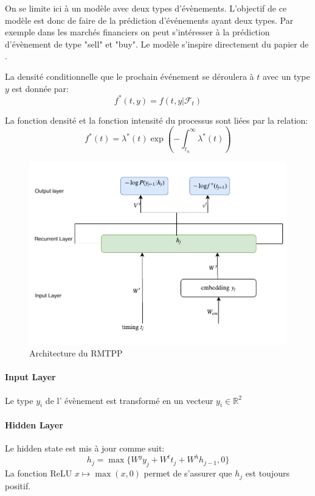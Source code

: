 \documentclass[../main.tex]{subfiles}
\begin{document}
On se limite ici à un modèle avec deux types d'évènements. L'objectif de ce modèle est donc de faire de la prédiction d'événements ayant deux types. Par exemple dans les marchés financiers on peut s'intéresser à la prédiction  d'évènement de type "sell" et "buy".  Le modèle s'inspire directement du papier de \citeauthor{DuRMTPP} \cite{DuRMTPP}.

La densité conditionnelle que le prochain événement se déroulera à $t$ avec un type $y$ est donnée par:
\begin{equation}
f^*(t,y) = f(t,y| \mathcal{F}_t)
\end{equation}

La fonction densité et la fonction intensité du processus sont liées par la relation:
\begin{equation}
f^*(t) = \lambda^*(t) \exp(-\int_{t_n}^{\infty}  \lambda^*(t) )
\end{equation}


\begin{figure}[!ht]
	\centering
	\includegraphics[width=\linewidth]{diagrams/rmtpp.pdf}
	\caption{Architecture du RMTPP}\label{fig:RMTPP}
\end{figure}


\paragraph{Input Layer}

Le type $y_{i}$  de l' évènement est transformé en un vecteur $y_{i } \in \mathbb{R} ^2$


\paragraph{Hidden Layer}
Le hidden state est mis à jour comme suit:
\begin{equation}
h_j = \max \{ W^y y_j + W^t t_j + W^h h_{j-1},0  \}  
\end{equation}
La fonction ReLU $x\mapsto \max(x,0)$ permet de s'assurer que $h_j$ est toujours positif.
\end{document}
